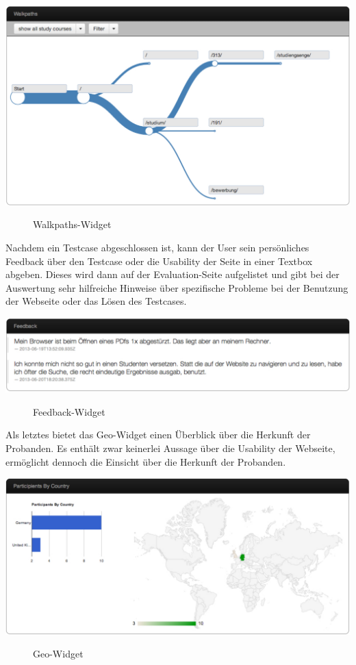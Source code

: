 \begin{center}
\includegraphics[scale=0.45]{./images/walkpathsWidget}
\end{center}
\begin{figure}[htb]
   \centering
   \caption{Walkpaths-Widget}
    \label{walkpathsWidget}
\end{figure}

Nachdem ein Testcase abgeschlossen ist, kann der User sein persönliches Feedback über den Testcase oder die Usability der Seite in einer Textbox abgeben. Dieses wird dann auf der Evaluation-Seite aufgelistet und gibt bei der Auswertung sehr hilfreiche Hinweise über spezifische Probleme bei der Benutzung der Webseite oder das Lösen des Testcases.

\begin{center}
\includegraphics[scale=0.45]{./images/feedbackWidget}
\end{center}
\begin{figure}[htb]
   \centering
   \caption{Feedback-Widget}
    \label{feedbackWidget}
\end{figure}

Als letztes bietet das Geo-Widget einen Überblick über die Herkunft der Probanden. Es enthält zwar keinerlei Aussage über die Usability der Webseite, ermöglicht dennoch die Einsicht über die Herkunft der Probanden.

\begin{center}
\includegraphics[scale=0.45]{./images/geoWidget}
\end{center}
\begin{figure}[htb]
   \centering
   \caption{Geo-Widget}
    \label{geoWidget}
\end{figure}